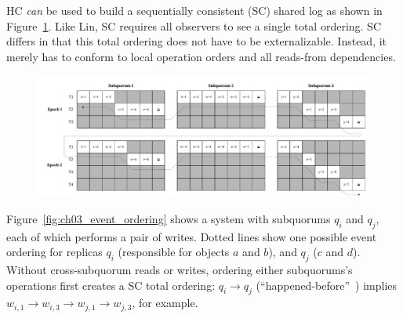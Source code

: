 HC \emph{can} be used to build a sequentially consistent (SC) shared log as shown in Figure~\ref{fig:ch03_log_ordering}.
Like Lin, SC requires all observers to see a single total ordering.
SC differs in that this total ordering does not have to be externalizable.
Instead, it merely has to conform to local operation orders and all reads-from dependencies.


\begin{landscape}
\begin{figure}
    \begin{center}
        \includegraphics[width=8.2in]{figures/ch03_log_ordering.pdf}
    \end{center}
    \renewcommand{\baselinestretch}{1}
    \small\normalsize

    \begin{quote}
        \caption[Grid Consistency: A Sequential Log Ordering]{}
        \label{fig:ch03_log_ordering}
    \end{quote}
\end{figure}
\renewcommand{\baselinestretch}{2}
\small\normalsize
\end{landscape}


Figure~\ref{fig:ch03_event_ordering} shows a system with subquorums $q_i$ and $q_j$, each of which performs a pair of writes.
Dotted lines show one possible event ordering for replicas $q_i$ (responsible for objects $a$ and $b$), and $q_j$ ($c$ and $d$).
Without cross-subquorum reads or writes, ordering either
subquorums's operations first creates a SC total ordering: $q_i \rightarrow q_j$ (``happened-before''~\cite{lamport_time_1978})
implies $w_{i,1} \rightarrow w_{i,3} \rightarrow w_{j,1} \rightarrow w_{j,3}$,
for example.

